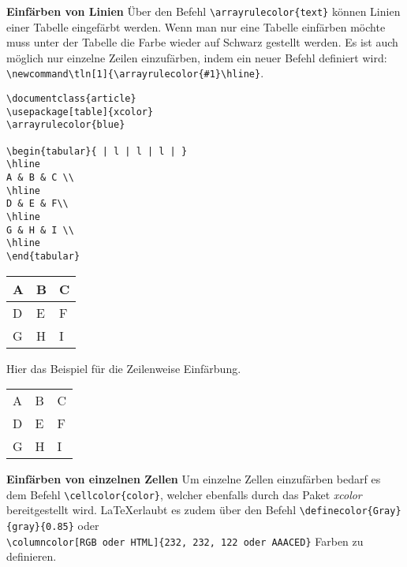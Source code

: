 \bigskip

\textbf{Einfärben von Linien}
Über den Befehl \verb|\arrayrulecolor{text}| können Linien einer Tabelle eingefärbt werden. Wenn man nur eine Tabelle einfärben möchte muss unter der Tabelle die Farbe wieder auf Schwarz gestellt werden. Es ist auch möglich nur einzelne Zeilen einzufärben, indem ein neuer Befehl definiert wird:\\ \verb|\newcommand\tln[1]{\arrayrulecolor{#1}\hline}|.

\begin{lstlisting}[style=LaTeX,caption={Einfache Tabelle mit Einfärbung der Linien},label=lst:tab8]
\documentclass{article}
\usepackage[table]{xcolor}
\arrayrulecolor{blue}

\begin{tabular}{ | l | l | l | }
\hline
A & B & C \\
\hline
D & E & F\\
\hline
G & H & I \\
\hline
\end{tabular}

\end{lstlisting}

	\begin{tabular}{ | l | l | l | }
		\hline
		A & B & C \\
		\hline
		D & E & F\\
		\hline
		G & H & I \\
		\hline
	\end{tabular}

Hier das Beispiel für die Zeilenweise Einfärbung.
\newcommand\tln[1]{\arrayrulecolor{#1}\hline}
\begin{tabular}{ | l | l | l | }
	\hline
	A & B & C \\ 
	\tln{red}
	D & E & F \\ 
	\hline
	G & H & I \\
	\hline
\end{tabular}

\bigskip

\textbf{Einfärben von einzelnen Zellen}
Um einzelne Zellen einzufärben bedarf es dem Befehl \verb|\cellcolor{color}|, welcher ebenfalls durch das Paket \emph{xcolor} bereitgestellt wird. \LaTeX erlaubt es zudem über den Befehl \verb|\definecolor{Gray}{gray}{0.85}| oder\\ \verb|\columncolor[RGB oder HTML]{232, 232, 122 oder AAACED}| Farben zu definieren. 


